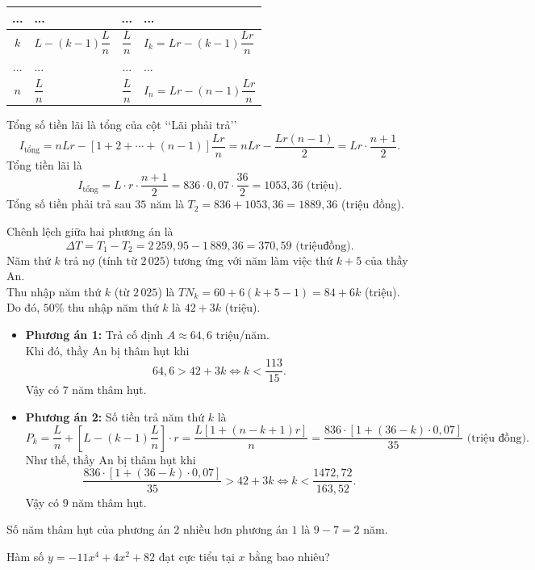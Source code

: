\begin{ex}
{\begin{itemchoice}
\begin{itemize}
\begin{center}
\begin{tabular}{|c|l|c|l|}
						... & ... & ... & ... \\
						\hline
						$k$ & $L-(k-1)\dfrac{L}{n}$ & $\dfrac{L}{n}$ & $I_k=Lr-(k-1)\dfrac{Lr}{n}$ \\
						\hline
						... & ... & ... & ... \\
						\hline
						$n$ & $\dfrac{L}{n}$ & $\dfrac{L}{n}$ & $I_n=Lr-(n-1)\dfrac{Lr}{n}$ \\
						\hline
					\end{tabular}
				\end{center}
				Tổng số tiền lãi là tổng của cột \lq\lq Lãi phải trả\rq\rq
				$$ I_{\text{tổng}} =nLr-\left[1+2+\cdots+(n-1)\right]\dfrac{Lr}{n}=nLr-\dfrac{Lr(n-1)}{2}=Lr\cdot\dfrac{n+1}{2}. $$
				Tổng tiền lãi là
				$$I_{\text{tổng}} = L \cdot r \cdot \frac{n+1}{2} = 836 \cdot 0,07 \cdot \frac{36}{2} = 1053,36 \text{ (triệu)}. $$
				Tổng số tiền phải trả sau $35$ năm là $T_2 = 836 + 1053,36 = 1889,36$ (triệu đồng).
			\end{itemize}
			Chênh lệch giữa hai phương án là
			$$\Delta T=T_1-T_2=2\,259{,}95-1\,889{,}36=370{,}59\text{ (triệuđồng)}. $$
			\itemch
			Năm thứ $k$ trả nợ (tính từ $2\,025$) tương ứng với năm làm việc thứ $k+5$ của thầy An. \\
			Thu nhập năm thứ $k$ (từ $2\,025$) là $TN_k=60+6(k+5-1)=84+6k$ (triệu). \\
			Do đó, $50\%$ thu nhập năm thứ $k$ là $42+3k$ (triệu).
			\begin{itemize}
				\item \textbf{Phương án 1:} Trả cố định $A \approx 64{,}6$ triệu/năm. \\
				Khi đó, thầy An bị thâm hụt khi $$64{,}6>42+3k\Leftrightarrow k <\dfrac{113}{15}. $$
				Vậy có $7$ năm thâm hụt.
				\item \textbf{Phương án 2:} Số tiền trả năm thứ $k$ là
				$$P_k=\dfrac{L}{n}+\left[L-(k-1)\dfrac{L}{n}\right]\cdot r=\dfrac{L\left[1+(n-k+1)r\right]}{n}=\dfrac{836\cdot\left[1+(36-k)\cdot 0{,}07\right]}{35} \text{ (triệu  đồng)}. $$
				Như thế, thầy An bị thâm hụt khi
				$$\dfrac{836\cdot\left[1+(36-k)\cdot 0{,}07\right]}{35}>42+3k\Leftrightarrow k < \dfrac{1472{,}72}{163{,}52}. $$
				Vậy có $9$ năm thâm hụt.
			\end{itemize}
			Số năm thâm hụt của phương án $2$ nhiều hơn phương án $1$ là $9-7=2$ năm.
		\end{itemchoice}
	}
\end{ex}
\caukq
\begin{ex}%
	Hàm số $y=-11x^4+4x^2+82$ đạt cực tiểu tại $x$ bằng bao nhiêu?
\end{ex}
